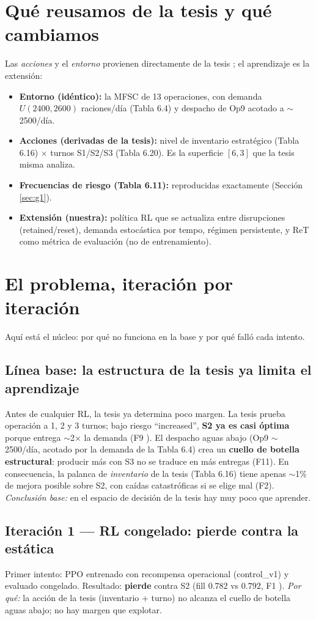 \documentclass[11pt,a4paper]{article}
\newcommand{\bad}[1]{\textcolor{red!60!black}{\textbf{#1}}}
\begin{document}
\section{Qué reusamos de la tesis y qué cambiamos}
Las \emph{acciones} y el \emph{entorno} provienen directamente de la tesis
\cite{tesis2017}; el aprendizaje es la extensión:
\begin{itemize}
  \item \textbf{Entorno (idéntico):} la MFSC de 13 operaciones, con demanda
  $U(2400,2600)$ raciones/día (Tabla 6.4) y despacho de Op9 acotado a $\sim$2500/día.
  \item \textbf{Acciones (derivadas de la tesis):} nivel de inventario estratégico
  (Tabla 6.16) $\times$ turnos S1/S2/S3 (Tabla 6.20). Es la superficie $[6,3]$ que la
  tesis misma analiza.
  \item \textbf{Frecuencias de riesgo (Tabla 6.11):} reproducidas exactamente
  (Sección \ref{sec:g1}).
  \item \textbf{Extensión (nuestra):} política RL que se actualiza entre disrupciones
  (retained/reset), demanda estocástica por tempo, régimen persistente, y ReT como
  métrica de evaluación (no de entrenamiento).
\end{itemize}

\section{El problema, iteración por iteración}
Aquí está el núcleo: por qué no funciona en la base y por qué falló cada intento.

\subsection{Línea base: la estructura de la tesis ya limita el aprendizaje}
Antes de cualquier RL, la tesis ya determina poco margen. La tesis prueba operación a
1, 2 y 3 turnos; bajo riesgo ``increased'', \textbf{S2 ya es casi óptima} porque entrega
$\sim$2× la demanda (F9 \cite{findings}). El despacho aguas abajo (Op9 $\sim$2500/día,
acotado por la demanda de la Tabla 6.4) crea un \textbf{cuello de botella estructural}:
producir más con S3 no se traduce en más entregas (F11). En consecuencia, la palanca de
\emph{inventario} de la tesis (Tabla 6.16) tiene apenas $\sim$1\% de mejora posible sobre
S2, con caídas catastróficas si se elige mal (F2). \emph{Conclusión base:} en el espacio
de decisión de la tesis hay muy poco que aprender.

\subsection{Iteración 1 --- RL congelado: pierde contra la estática}
Primer intento: PPO entrenado con recompensa operacional (control\_v1) y evaluado
congelado. Resultado: \bad{pierde} contra S2 (fill $0.782$ vs $0.792$, F1
\cite{findings}). \emph{Por qué:} la acción de la tesis (inventario + turno) no alcanza
el cuello de botella aguas abajo; no hay margen que explotar.
\end{document}
